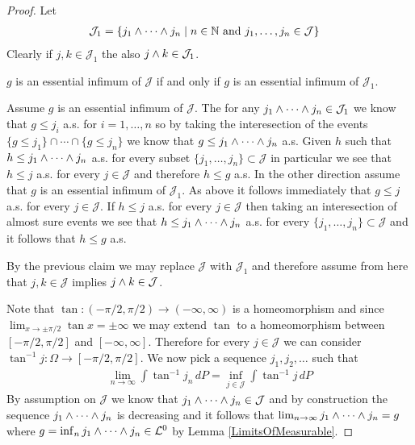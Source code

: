 \begin{proof}
Let 
\begin{align*}
\mathcal{J}_1 &= \lbrace j_1 \wedge \dotsb \wedge j_n \mid n \in \mathbb{N} \text{ and } j_1, \dotsc, j_n \in \mathcal{J} \rbrace
\end{align*}
Clearly if $j,k \in \mathcal{J}_1$ the also $j \wedge k \in \mathcal{J}_1$.  
\begin{clm} $g$ is an essential infimum of $\mathcal{J}$ if and only if $g$ is an essential infimum of $\mathcal{J}_1$.
\end{clm}
Assume $g$ is an essential infimum of $\mathcal{J}$.  The for any $j_1 \wedge \dotsb \wedge j_n  \in \mathcal{J}_1$ we know that $g \leq j_i$ a.s. for $i=1, \dotsc, n$ so by taking the interesection of the events $\lbrace g \leq j_1 \rbrace \cap \dotsb \cap \lbrace g \leq j_n \rbrace$ we know that $g \leq j_1 \wedge \dotsb \wedge j_n$ a.s.  Given $h$ such that $h \leq j_1 \wedge \dotsb \wedge j_n$ a.s. for every subset $\lbrace j_1, \dotsc, j_n \rbrace \subset \mathcal{J}$ in particular we see that $h \leq j$ a.s. for every $j \in \mathcal{J}$ and therefore $h \leq g$ a.s.  In the other direction assume that $g$ is an essential infimum of $\mathcal{J}_1$.  As above it follows immediately that $g \leq j$ a.s. for every $j \in \mathcal{J}$.  If $h \leq j$ a.s. for every $j \in \mathcal{J}$ then taking an interesection of almost sure events we see that $h \leq j_1 \wedge \dotsb \wedge j_n$ a.s. for every $\lbrace j_1, \dotsc, j_n \rbrace \subset \mathcal{J}$ and it follows that $h \leq g$ a.s.

By the previous claim we may replace $\mathcal{J}$ with $\mathcal{J}_1$ and therefore assume from here that $j,k \in \mathcal{J}$ implies $j \wedge k \in \mathcal{J}$.

Note that $\tan : (-\pi/2, \pi/2) \to (-\infty, \infty)$ is a homeomorphism and since $\lim_{x \to \pm \pi/2} \tan x = \pm \infty$ we may extend $\tan$ to a homeomorphism between $[-\pi/2, \pi/2]$ and $[-\infty, \infty]$.  Therefore for every $j \in \mathcal{J}$ we can consider $\tan^{-1} j : \Omega \to [-\pi/2, \pi/2]$.  We now pick a sequence $j_1, j_2, \dotsc$ such that
\begin{align*}
\lim_{n \to \infty} \int \tan^{-1} j_n \, dP = \inf_{j \in \mathcal{J}} \int \tan^{-1} j \, dP
\end{align*}
By assumption on $\mathcal{J}$ we know that $j_1 \wedge \dotsb \wedge j_n \in \mathcal{J}$ and by construction the sequence $j_1 \wedge \dotsb \wedge j_n$ is decreasing and it follows that 
$\lim_{n \to \infty} j_1 \wedge \dotsb \wedge j_n = g$ where $g = \inf_n j_1 \wedge \dotsb \wedge j_n \in \mathcal{L}^0$ by Lemma \ref{LimitsOfMeasurable}.   


\end{proof}
